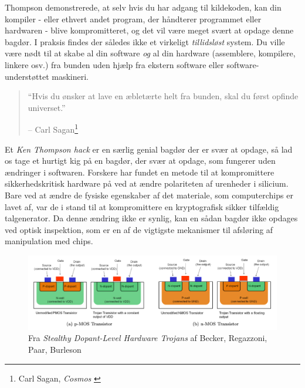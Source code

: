 \documentclass[paper=6in:9in,pagesize=pdftex,
               headinclude=on,footinclude=on,12pt]{scrbook}
\begin{document}
Thompson demonstrerede, at selv hvis du har adgang til kildekoden, kan din kompiler - eller ethvert andet program, der håndterer programmet eller hardwaren - blive kompromitteret, og det vil være meget svært at opdage denne bagdør. I praksis findes der således ikke et virkeligt \textit{tillidsløst} system. Du ville være nødt til at skabe al din software \textit{og} al din hardware (assemblere, kompilere, linkere osv.) fra bunden uden hjælp fra ekstern software eller software-understøttet maskineri.\begin{quotation}\begin{samepage} \enquote{Hvis du ønsker at lave en æbletærte helt fra bunden, skal du først opfinde universet.} \begin{flushright} -- Carl Sagan\footnote{Carl Sagan, \textit{Cosmos} \cite{cosmos}}
\end{flushright}\end{samepage}\end{quotation}

Et \textit{Ken Thompson hack} er en særlig genial bagdør der er svær at opdage, så lad os tage et hurtigt kig på en bagdør, der svær at opdage, som fungerer uden ændringer i softwaren. Forskere har fundet en metode til at kompromittere sikkerhedskritisk hardware på ved at ændre polariteten af urenheder i silicium.~\cite{becker2013stealthy} Bare ved at ændre de fysiske egenskaber af det materiale, som computerchips er lavet af, var de i stand til at kompromittere en kryptografisk sikker tilfældig talgenerator. Da denne ændring ikke er synlig, kan en sådan bagdør ikke opdages ved optisk inspektion, som er en af de vigtigste mekanismer til afsløring af manipulation med chips.\begin{figure}
  \includegraphics{assets/images/stealthy-hardware-trojan.png}
  \caption{Fra \textit{Stealthy Dopant-Level Hardware Trojans} af Becker, Regazzoni, Paar, Burleson}
  \label{fig:stealthy-hardware-trojan}
\end{figure}
\end{document}
